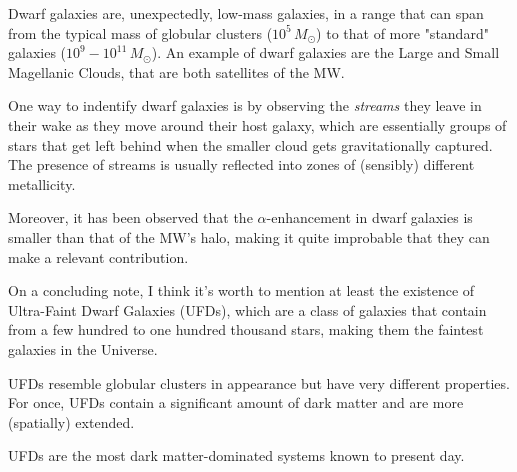 Dwarf galaxies are, unexpectedly, low-mass galaxies, in a range that can span from the typical mass of globular clusters ($10^{5}\,M_{\odot}$) to that of more "standard" galaxies ($10^{9}-10^{11}\,M_{\odot}$). An example of dwarf galaxies are the Large and Small Magellanic Clouds, that are both satellites of the MW.
\par One way to indentify dwarf galaxies is by observing the \emph{streams} they leave in their wake as they move around their host galaxy, which are essentially groups of stars that get left behind when the smaller cloud gets gravitationally captured. The presence of streams is usually reflected into zones of (sensibly) different metallicity.
\par Moreover, it has been observed that the $\alpha$-enhancement in dwarf galaxies is smaller than that of the MW's halo, making it quite improbable that they can make a relevant contribution.
\par On a concluding note, I think it's worth to mention at least the existence of Ultra-Faint Dwarf Galaxies (UFDs), which are a class of galaxies that contain from a few hundred to one hundred thousand stars, making them the faintest galaxies in the Universe.\par UFDs resemble globular clusters in appearance but have very different properties. For once, UFDs contain a significant amount of dark matter and are more (spatially) extended.
\par UFDs are the most dark matter-dominated systems known to present day.